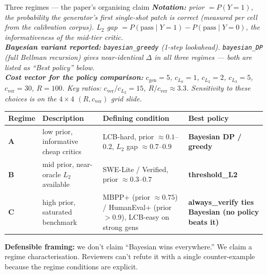 \documentclass[10pt]{beamer}
\newcommand{\good}[1]{\textcolor{accentGreen}{\textbf{#1}}}
\newcommand{\warn}[1]{\textcolor{accentOrange}{\textbf{#1}}}
\newcommand{\info}[1]{\textcolor{primaryBlue}{\textbf{#1}}}
\begin{document}
\begin{frame}{Three regimes --- the paper's organising claim}
\vspace{0.05cm}
{\footnotesize\itshape
\textbf{Notation:} \emph{prior} $= P(Y{=}1)$, the probability the
generator's first single-shot patch is correct (measured per cell from
the calibration corpus). \quad $L_2$ \emph{gap} $= P(\mathrm{pass}\mid
Y{=}1) - P(\mathrm{pass}\mid Y{=}0)$, the informativeness of the
mid-tier critic.\\[2pt]
\textbf{Bayesian variant reported:} \texttt{bayesian\_greedy} (1-step
lookahead). \texttt{bayesian\_DP} (full Bellman recursion) gives
near-identical $\Delta$ in all three regimes --- both are listed as
``Best policy'' below.\\[2pt]
\textbf{Cost vector for the policy comparison:}
$c_\mathrm{gen}{=}5$, $c_{L_0}{=}1$, $c_{L_2}{=}2$, $c_{L_3}{=}5$,
$c_\mathrm{ver}{=}30$, $R{=}100$. Key ratios: $c_\mathrm{ver}/c_{L_2}
{=}15$, $R/c_\mathrm{ver}{\approx}3.3$. Sensitivity to these choices is
on the $4{\times}4$ $(R, c_\mathrm{ver})$ grid slide.}
\vspace{0.05cm}
\begin{table}
\centering
\small
\setlength{\tabcolsep}{4pt}
\begin{tabular}{>{\raggedright\arraybackslash}p{1.3cm}>{\raggedright\arraybackslash}p{3.4cm}>{\raggedright\arraybackslash}p{3.5cm}>{\raggedright\arraybackslash}p{2.4cm}}
\toprule
\rowcolor{paleBlue}\textbf{Regime} & \textbf{Description} & \textbf{Defining condition} & \textbf{Best policy} \\
\midrule
\rowcolor{paleGreen}\textbf{A} & low prior, informative cheap critics &
LCB-hard, prior $\approx 0.1$--$0.2$, $L_2$ gap $\approx 0.7$--$0.9$ &
\good{Bayesian DP / greedy} \\
\rowcolor{paleBlue}\textbf{B} & mid prior, near-oracle $L_2$ available &
SWE-Lite / Verified, prior $\approx 0.3$--$0.7$ &
\warn{threshold\_L2} \\
\rowcolor{paleOrange}\textbf{C} & high prior, saturated benchmark &
MBPP+ (prior $\approx 0.75$) / HumanEval+ (prior $> 0.9$), LCB-easy on strong gens &
\warn{always\_verify ties Bayesian (no policy beats it)} \\
\bottomrule
\end{tabular}
\end{table}
\vspace{0.3cm}
\info{Defensible framing:} we don't claim ``Bayesian wins everywhere.''
We claim a regime characterisation. Reviewers can't refute it with a single
counter-example because the regime conditions are explicit.
\end{frame}
\end{document}
